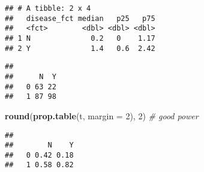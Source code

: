 \documentclass[
]{article}
\newenvironment{Shaded}{\begin{snugshade}}{\end{snugshade}}
\newcommand{\AttributeTok}[1]{\textcolor[rgb]{0.13,0.29,0.53}{#1}}
\newcommand{\CommentTok}[1]{\textcolor[rgb]{0.56,0.35,0.01}{\textit{#1}}}
\newcommand{\DecValTok}[1]{\textcolor[rgb]{0.00,0.00,0.81}{#1}}
\newcommand{\FunctionTok}[1]{\textcolor[rgb]{0.13,0.29,0.53}{\textbf{#1}}}
\newcommand{\NormalTok}[1]{#1}
\newcommand{\OtherTok}[1]{\textcolor[rgb]{0.56,0.35,0.01}{#1}}
\newcommand{\SpecialCharTok}[1]{\textcolor[rgb]{0.81,0.36,0.00}{\textbf{#1}}}
\begin{document}
\begin{verbatim}
## # A tibble: 2 x 4
##   disease_fct median   p25   p75
##   <fct>        <dbl> <dbl> <dbl>
## 1 N              0.2   0    1.17
## 2 Y              1.4   0.6  2.42
\end{verbatim}

\begin{Shaded}
\end{Shaded}

\begin{verbatim}
##    
##      N  Y
##   0 63 22
##   1 87 98
\end{verbatim}

\begin{Shaded}
\begin{Highlighting}[]
\FunctionTok{round}\NormalTok{(}\FunctionTok{prop.table}\NormalTok{(t, }\AttributeTok{margin =} \DecValTok{2}\NormalTok{), }\DecValTok{2}\NormalTok{) }\CommentTok{\# good power }
\end{Highlighting}
\end{Shaded}

\begin{verbatim}
##    
##        N    Y
##   0 0.42 0.18
##   1 0.58 0.82
\end{verbatim}
\end{document}
